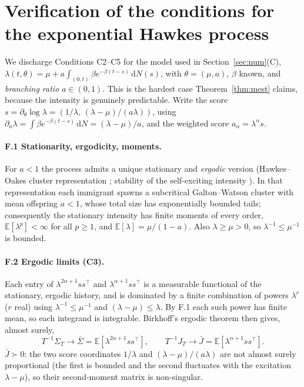 \documentclass[smallextended,natbib]{svjour3}
\newcommand{\dd}{\,\mathrm{d}}
\newcommand{\E}{\mathbb{E}}
\begin{document}
\section{Verification of the conditions for the exponential Hawkes process}
\label{app:hawkes}
We discharge Conditions C2--C5 for the model used in Section~\ref{sec:num}(C),
$\lambda(t,\theta)=\mu+a\int_{(0,t)}\beta e^{-\beta(t-s)}\dd N(s)$, with
$\theta=(\mu,a)$, $\beta$ known, and \emph{branching ratio} $a\in(0,1)$. This is the
hardest case Theorem~\ref{thm:mest} claims, because the intensity is genuinely
predictable. Write the score $s=\partial_\theta\log\lambda=(1/\lambda,\,(\lambda-\mu)/(a\lambda))$,
using $\partial_a\lambda=\int\beta e^{-\beta(t-s)}\dd N=(\lambda-\mu)/a$, and the
weighted score $a_\alpha=\lambda^{\alpha}s$.

\paragraph{F.1 Stationarity, ergodicity, moments.}
For $a<1$ the process admits a unique stationary and \emph{ergodic} version
(Hawkes--Oakes cluster representation \citep{hawkes1974}; stability of the
self-exciting intensity \citep{bremaud1996}). In that representation each immigrant
spawns a subcritical Galton--Watson cluster with mean offspring $a<1$, whose total
size has exponentially bounded tails; consequently the stationary intensity has
finite moments of every order, $\E[\lambda^{p}]<\infty$ for all $p\ge1$, and
$\E[\lambda]=\mu/(1-a)$. Also $\lambda\ge\mu>0$, so $\lambda^{-1}\le\mu^{-1}$ is
bounded.

\paragraph{F.2 Ergodic limits (C3).}
Each entry of $\lambda^{2\alpha+1}ss^{\top}$ and $\lambda^{\alpha+1}ss^{\top}$ is a
measurable functional of the stationary, ergodic history, and is dominated by a
finite combination of powers $\lambda^{r}$ ($r$ real) using $\lambda^{-1}\le\mu^{-1}$
and $(\lambda-\mu)\le\lambda$. By F.1 each such power has finite mean, so each
integrand is integrable. Birkhoff's ergodic theorem then gives, almost surely,
\[
T^{-1}\Sigma_T\to\bar\Sigma=\E[\lambda^{2\alpha+1}ss^{\top}],\qquad
T^{-1}J_T\to\bar J=\E[\lambda^{\alpha+1}ss^{\top}].
\]
$\bar J\succ0$: the two score coordinates $1/\lambda$ and $(\lambda-\mu)/(a\lambda)$
are not almost surely proportional (the first is bounded and the second fluctuates
with the excitation $\lambda-\mu$), so their second-moment matrix is non-singular.
\end{document}
